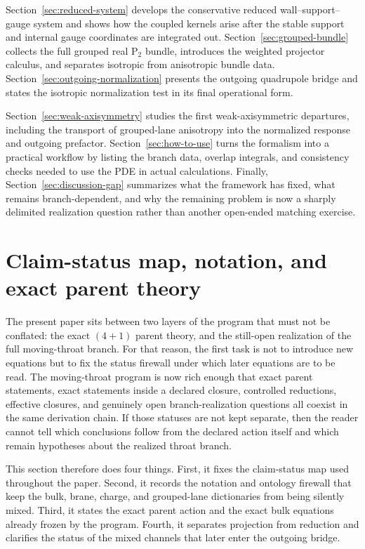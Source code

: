 \documentclass[11pt]{article}
\theoremstyle{definition}
\newcommand{\Ptwo}{\ensuremath{\mathrm{P}_2}}
\begin{document}
Section~\ref{sec:reduced-system} develops the conservative reduced wall--support--gauge system and shows how the coupled kernels arise after the stable support and internal gauge coordinates are integrated out. Section~\ref{sec:grouped-bundle} collects the full grouped real $\Ptwo$ bundle, introduces the weighted projector calculus, and separates isotropic from anisotropic bundle data. Section~\ref{sec:outgoing-normalization} presents the outgoing quadrupole bridge and states the isotropic normalization test in its final operational form.

Section~\ref{sec:weak-axisymmetry} studies the first weak-axisymmetric departures, including the transport of grouped-lane anisotropy into the normalized response and outgoing prefactor. Section~\ref{sec:how-to-use} turns the formalism into a practical workflow by listing the branch data, overlap integrals, and consistency checks needed to use the PDE in actual calculations. Finally, Section~\ref{sec:discussion-gap} summarizes what the framework has fixed, what remains branch-dependent, and why the remaining problem is now a sharply delimited realization question rather than another open-ended matching exercise.

\section{Claim-status map, notation, and exact parent theory}
\label{sec:status-parent}

The present paper sits between two layers of the program that must not be conflated: the exact $(4+1)$ parent theory, and the still-open realization of the full moving-throat branch. For that reason, the first task is not to introduce new equations but to fix the status firewall under which later equations are to be read. The moving-throat program is now rich enough that exact parent statements, exact statements inside a declared closure, controlled reductions, effective closures, and genuinely open branch-realization questions all coexist in the same derivation chain. If those statuses are not kept separate, then the reader cannot tell which conclusions follow from the declared action itself and which remain hypotheses about the realized throat branch.

This section therefore does four things. First, it fixes the claim-status map used throughout the paper. Second, it records the notation and ontology firewall that keep the bulk, brane, charge, and grouped-lane dictionaries from being silently mixed. Third, it states the exact parent action and the exact bulk equations already frozen by the program. Fourth, it separates projection from reduction and clarifies the status of the mixed channels that later enter the outgoing bridge.
\end{document}
